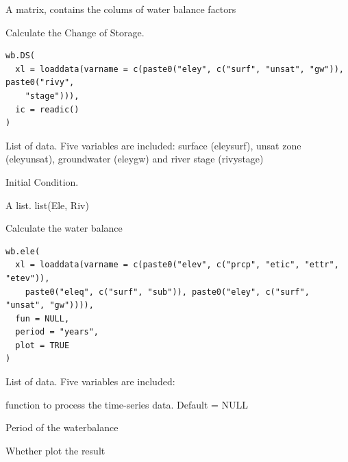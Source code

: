 \documentclass[a4paper]{book}
\begin{document}
%
\begin{Value}
A matrix, contains the colums of water balance factors
\end{Value}
%
\begin{Description}\relax
Calculate the Change of Storage.
\end{Description}
%
\begin{Usage}
\begin{verbatim}
wb.DS(
  xl = loaddata(varname = c(paste0("eley", c("surf", "unsat", "gw")), paste0("rivy",
    "stage"))),
  ic = readic()
)
\end{verbatim}
\end{Usage}
%
\begin{Arguments}
\begin{ldescription}
\item[\code{xl}] List of data. Five variables are included: surface (eleysurf), unsat zone (eleyunsat), groundwater (eleygw) and river stage (rivystage)

\item[\code{ic}] Initial Condition.
\end{ldescription}
\end{Arguments}
%
\begin{Value}
A list. list(Ele, Riv)
\end{Value}
%
\begin{Description}\relax
Calculate the water balance
\end{Description}
%
\begin{Usage}
\begin{verbatim}
wb.ele(
  xl = loaddata(varname = c(paste0("elev", c("prcp", "etic", "ettr", "etev")),
    paste0("eleq", c("surf", "sub")), paste0("eley", c("surf", "unsat", "gw")))),
  fun = NULL,
  period = "years",
  plot = TRUE
)
\end{verbatim}
\end{Usage}
%
\begin{Arguments}
\begin{ldescription}
\item[\code{xl}] List of data. Five variables are included:

\item[\code{fun}] function to process the time-series data. Default = NULL

\item[\code{period}] Period of the waterbalance

\item[\code{plot}] Whether plot the result
\end{ldescription}
\end{Arguments}
\end{document}

